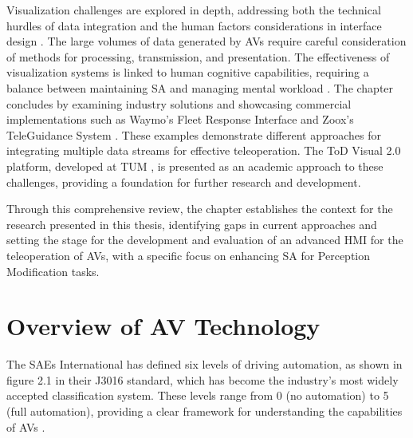 Visualization challenges are explored in depth, addressing both the technical hurdles of data integration and the human factors considerations
in interface design \cite{sworder1999performance,Gnatzig}. The large volumes of data generated by \acp{AV} require careful consideration of methods for
processing, transmission, and presentation. The effectiveness of visualization systems is linked to human cognitive capabilities,
requiring a balance between maintaining \ac{SA} and managing mental workload \cite{wickens2008multiple}.
The chapter concludes by examining industry solutions and showcasing commercial implementations such as Waymo's Fleet Response Interface and
Zoox's TeleGuidance System \cite{waymo2024fleetresponse,zoox2024teleguidance}. These examples demonstrate different approaches for integrating
multiple data streams for effective teleoperation. The ToD Visual 2.0 platform, developed at TUM \cite{Schimpe}, is presented as an academic approach to these challenges, providing a foundation for further research and development.

Through this comprehensive review, the chapter establishes the context for the research presented in this thesis,
identifying gaps in current approaches and setting the stage for the development and evaluation of an advanced
\ac{HMI} for the teleoperation of \acp{AV}, with a specific focus on enhancing \ac{SA} for Perception Modification tasks.

\section{Overview of \ac{AV} Technology}

The \acp{SAE} International has defined six levels of
driving automation, as shown in figure 2.1 in their J3016 standard, which has become
the industry's most widely accepted classification system. These levels range from 0
(no automation) to 5 (full automation), providing a clear framework for understanding
the capabilities of \acp{AV} \cite{sae2021}.

